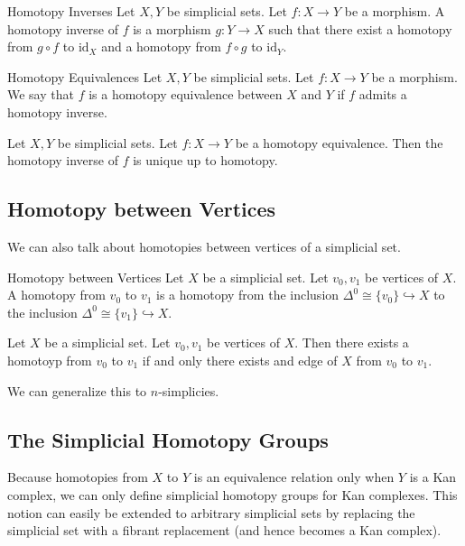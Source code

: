 \documentclass[a4paper]{article}
\begin{document}
\begin{defn}{Homotopy Inverses}{} Let $X,Y$ be simplicial sets. Let $f:X\to Y$ be a morphism. A homotopy inverse of $f$ is a morphism $g:Y\to X$ such that there exist a homotopy from $g\circ f$ to $\text{id}_X$ and a homotopy from $f\circ g$ to $\text{id}_Y$. 
\end{defn}

\begin{defn}{Homotopy Equivalences}{} Let $X,Y$ be simplicial sets. Let $f:X\to Y$ be a morphism. We say that $f$ is a homotopy equivalence between $X$ and $Y$ if $f$ admits a homotopy inverse. 
\end{defn}

\begin{lmm}{}{} Let $X,Y$ be simplicial sets. Let $f:X\to Y$ be a homotopy equivalence. Then the homotopy inverse of $f$ is unique up to homotopy. 
\end{lmm}

\subsection{Homotopy between Vertices}
We can also talk about homotopies between vertices of a simplicial set. 

\begin{defn}{Homotopy between Vertices}{} Let $X$ be a simplicial set. Let $v_0,v_1$ be vertices of $X$. A homotopy from $v_0$ to $v_1$ is a homotopy from the inclusion $\Delta^0\cong\{v_0\}\hookrightarrow X$ to the inclusion $\Delta^0\cong\{v_1\}\hookrightarrow X$. 
\end{defn}

\begin{lmm}{}{} Let $X$ be a simplicial set. Let $v_0,v_1$ be vertices of $X$. Then there exists a homotoyp from $v_0$ to $v_1$ if and only there exists and edge of $X$ from $v_0$ to $v_1$. 
\end{lmm}

We can generalize this to $n$-simplicies. 

\subsection{The Simplicial Homotopy Groups}
Because homotopies from $X$ to $Y$ is an equivalence relation only when $Y$ is a Kan complex, we can only define simplicial homotopy groups for Kan complexes. This notion can easily be extended to arbitrary simplicial sets by replacing the simplicial set with a fibrant replacement (and hence becomes a Kan complex). 
\end{document}
